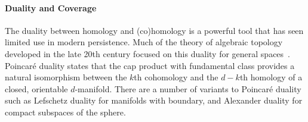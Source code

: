 

%
%
%

\paragraph{Duality and Coverage}


The duality between homology and (co)homology is a powerful tool that has seen limited use in modern persistence.
Much of the theory of algebraic topology developed in the late 20th century focused on this duality for general spaces~\cite{spanier66algebraic,munkres84elements,bredon93,hatcher01}.
Poincar\'e duality states that the cap product with fundamental class provides a natural isomorphism between the $k$th cohomology and the $d-k$th homology of a closed, orientable $d$-manifold.
There are a number of variants to Poincar\'e duality such as Lefschetz duality for manifolds with boundary, and Alexander duality for compact subspaces of the sphere.

